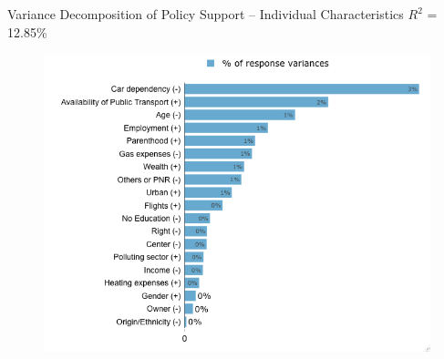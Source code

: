 \begin{framefont}{\small}
\begin{frame}{Variance Decomposition of Policy Support -- Individual Characteristics}%
\vspace{-.1cm}
{\footnotesize $R^2$ = 12.85\%}
\begin{figure}[h!]
\vspace{-.1cm}
\includegraphics[width=.7\textwidth]{../figures/FR/lmg_main_policies_socio_non_standardized} \\
\end{figure}
\end{frame}





\end{framefont}
